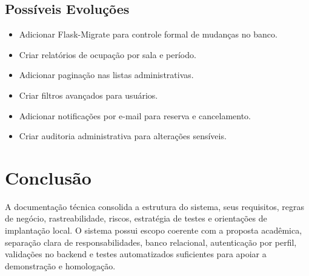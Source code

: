 \documentclass[12pt,a4paper]{article}
\begin{document}
\subsection{Possíveis Evoluções}
\begin{itemize}
    \item Adicionar Flask-Migrate para controle formal de mudanças no banco.
    \item Criar relatórios de ocupação por sala e período.
    \item Adicionar paginação nas listas administrativas.
    \item Criar filtros avançados para usuários.
    \item Adicionar notificações por e-mail para reserva e cancelamento.
    \item Criar auditoria administrativa para alterações sensíveis.
\end{itemize}

\section{Conclusão}
A documentação técnica consolida a estrutura do sistema, seus requisitos, regras de negócio, rastreabilidade, riscos, estratégia de testes e orientações de implantação local. O sistema possui escopo coerente com a proposta acadêmica, separação clara de responsabilidades, banco relacional, autenticação por perfil, validações no backend e testes automatizados suficientes para apoiar a demonstração e homologação.
\end{document}

